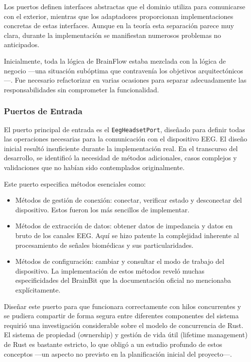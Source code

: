 Los puertos definen interfaces abstractas que el dominio utiliza para comunicarse con el exterior, mientras que los adaptadores proporcionan implementaciones concretas de estas interfaces. Aunque en la teoría esta separación parece muy clara, durante la implementación se manifiestan numerosos problemas no anticipados.

Inicialmente, toda la lógica de BrainFlow estaba mezclada con la lógica de negocio —una situación subóptima que contravenía los objetivos arquitectónicos—. Fue necesario refactorizar en varias ocasiones para separar adecuadamente las responsabilidades sin comprometer la funcionalidad.

\subsubsection{Puertos de Entrada}

El puerto principal de entrada es el \texttt{EegHeadsetPort}, diseñado para definir todas las operaciones necesarias para la comunicación con el dispositivo EEG. El diseño inicial resultó insuficiente durante la implementación real. En el transcurso del desarrollo, se identificó la necesidad de métodos adicionales, casos complejos y validaciones que no habían sido contemplados originalmente.

Este puerto especifica métodos esenciales como:

\begin{itemize}
    \item Métodos de gestión de conexión: conectar, verificar estado y desconectar del dispositivo. Estos fueron los más sencillos de implementar.
    \item Métodos de extracción de datos: obtener datos de impedancia y datos en bruto de los canales EEG. Aquí se hizo patente la complejidad inherente al procesamiento de señales biomédicas y sus particularidades.
    \item Métodos de configuración: cambiar y consultar el modo de trabajo del dispositivo. La implementación de estos métodos reveló muchas especificidades del BrainBit que la documentación oficial no mencionaba explícitamente.
\end{itemize}

Diseñar este puerto para que funcionara correctamente con hilos concurrentes y se pudiera compartir de forma segura entre diferentes componentes del sistema requirió una investigación considerable sobre el modelo de concurrencia de Rust. El sistema de propiedad (ownership) y gestión de vida útil (lifetime management) de Rust es bastante estricto, lo que obligó a un estudio profundo de estos conceptos —un aspecto no previsto en la planificación inicial del proyecto—.

